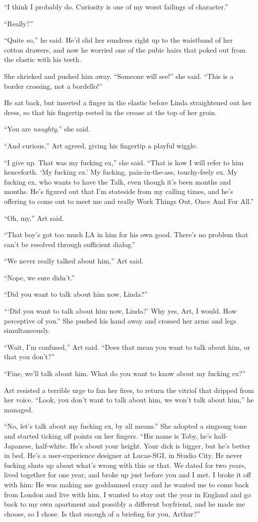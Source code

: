 “I think I probably do. Curiosity is one of my worst failings of
character.”

“Really?”

“Quite so,” he said. He’d slid her sundress right up to the
waistband of her cotton drawers, and now he worried one of the
pubic hairs that poked out from the elastic with his teeth.

She shrieked and pushed him away. “Someone will see!” she said.
“This is a border crossing, not a bordello!”

He sat back, but inserted a finger in the elastic before Linda
straightened out her dress, so that his fingertip rested in the
crease at the top of her groin.

“You are \emph{naughty},” she said.

“And curious,” Art agreed, giving his fingertip a playful wiggle.

“I give up. That was my fucking ex,” she said. “That is how I will
refer to him henceforth. ‘My fucking ex.’ My fucking,
pain-in-the-ass, touchy-feely ex. My fucking ex, who wants to have
the Talk, even though it’s been months and months. He’s figured out
that I’m stateside from my calling times, and he’s offering to come
out to meet me and really Work Things Out, Once And For All.”

“Oh, my,” Art said.

“That boy’s got too much LA in him for his own good. There’s no
problem that can’t be resolved through sufficient dialog.”

“We never really talked about him,” Art said.

“Nope, we sure didn’t.”

“Did you want to talk about him now, Linda?”

“‘Did you want to talk about him now, Linda?’ Why yes, Art, I
would. How perceptive of you.” She pushed his hand away and crossed
her arms and legs simultaneously.

“Wait, I’m confused,” Art said. “Does that mean you want to talk
about him, or that you don’t?”

“Fine, we’ll talk about him. What do you want to know about my
fucking ex?”

Art resisted a terrible urge to fan her fires, to return the
vitriol that dripped from her voice. “Look, you don’t want to talk
about him, we won’t talk about him,” he managed.

“No, let’s talk about my fucking ex, by all means.” She adopted a
singsong tone and started ticking off points on her fingers. “His
name is Toby, he’s half-Japanese, half-white. He’s about your
height. Your dick is bigger, but he’s better in bed. He’s a
user-experience designer at Lucas-SGI, in Studio City. He never
fucking shuts up about what’s wrong with this or that. We dated for
two years, lived together for one year, and broke up just before
you and I met. I broke it off with him: He was making me goddamned
crazy and he wanted me to come back from London and live with him.
I wanted to stay out the year in England and go back to my own
apartment and possibly a different boyfriend, and he made me
choose, so I chose. Is that enough of a briefing for you, Arthur?”

